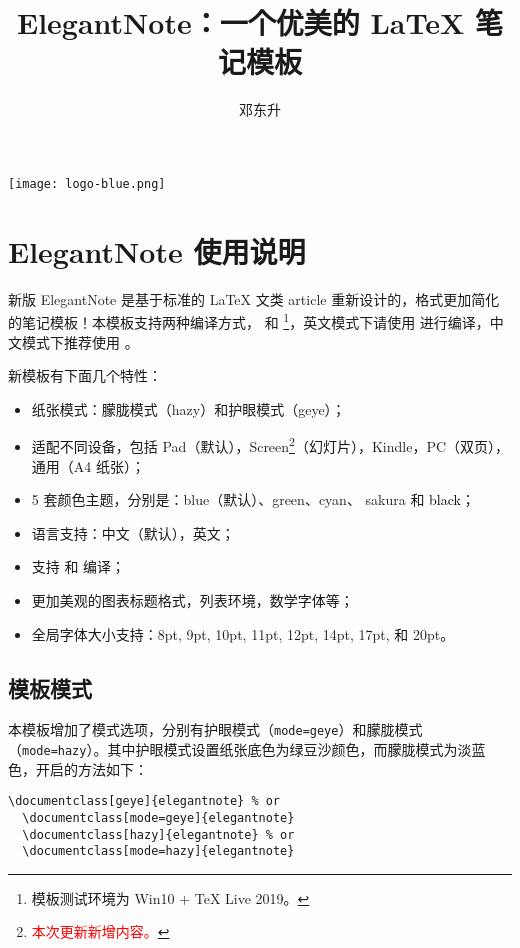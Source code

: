 \documentclass[cn,hazy,blue,screen,14pt]{elegantnote}
\title{ElegantNote：一个优美的 \LaTeX{} 笔记模板}
\author{邓东升}
\institute{Elegant\LaTeX{} Program}
\date{\zhtoday}
\begin{document}
\maketitle

\centerline{
  \texttt{[image: logo-blue.png]}
}


\section{ElegantNote 使用说明}

新版 ElegantNote 是基于标准的 \LaTeX{} 文类 article 重新设计的，格式更加简化的笔记模板！本模板支持两种编译方式， 和 \footnote{模板测试环境为 Win10 + \TeX{} Live 2019。}，英文模式下请使用  进行编译，中文模式下推荐使用 。

新模板有下面几个特性：
\begin{itemize}
  \item 纸张模式：朦胧模式（hazy）和护眼模式（geye）；
  \item 适配不同设备，包括 Pad（默认），Screen\footnote{\textcolor{red}{本次更新新增内容。}}（幻灯片），Kindle，PC（双页），通用（A4 纸张）；
  \item 5 套颜色主题，分别是：\textcolor{eblue}{blue}（默认）、\textcolor{egreen}{green}、\textcolor{ecyan}{cyan}、 \textcolor{sakura}{sakura} 和 \textcolor{black}{black}；
  \item 语言支持：中文（默认），英文；
  \item 支持  和  编译；
  \item 更加美观的图表标题格式，列表环境，数学字体等；
  \item 全局字体大小支持：8pt, 9pt, 10pt, 11pt, 12pt, 14pt, 17pt, 和 20pt。
\end{itemize}


\subsection{模板模式}

本模板增加了模式选项，分别有护眼模式（\lstinline{mode=geye}）和朦胧模式（\lstinline{mode=hazy}）。其中护眼模式设置纸张底色为绿豆沙颜色，而朦胧模式为淡蓝色，开启的方法如下：
\begin{lstlisting}[frame=none]  
  \documentclass[geye]{elegantnote} % or
  \documentclass[mode=geye]{elegantnote}
  \documentclass[hazy]{elegantnote} % or
  \documentclass[mode=hazy]{elegantnote}
\end{lstlisting}
\end{document}
